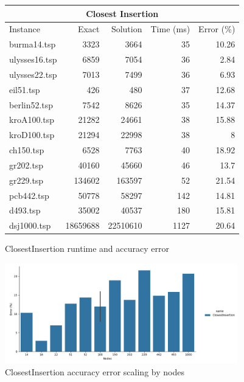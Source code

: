 \begin{figure}[H]
    \centering

    \begin{tabular}{lrrrr}
    \toprule
    \multicolumn{5}{c}{Closest Insertion} \\
    \hline
    Instance & Exact & Solution &   Time (ms) &   Error (\%) \\
    \hline
    burma14.tsp   &     3323 &       3664 &          35 &       10.26 \\
    ulysses16.tsp &     6859 &       7054 &          36 &        2.84 \\
    ulysses22.tsp &     7013 &       7499 &          36 &        6.93 \\
    eil51.tsp     &      426 &        480 &          37 &       12.68 \\
    berlin52.tsp  &     7542 &       8626 &          35 &       14.37 \\
    kroA100.tsp   &    21282 &      24661 &          38 &       15.88 \\
    kroD100.tsp   &    21294 &      22998 &          38 &        8    \\
    ch150.tsp     &     6528 &       7763 &          40 &       18.92 \\
    gr202.tsp     &    40160 &      45660 &          46 &       13.7  \\
    gr229.tsp     &   134602 &     163597 &          52 &       21.54 \\
    pcb442.tsp    &    50778 &      58297 &         142 &       14.81 \\
    d493.tsp      &    35002 &      40537 &         180 &       15.81 \\
    dsj1000.tsp   & 18659688 &   22510610 &        1127 &       20.64 \\
    \bottomrule
    \end{tabular}

    \caption{ClosestInsertion runtime and accuracy error}
    \label{table:closest-insertion-runtime-accuracy}
\end{figure}

\begin{figure}[H]
    \centering

    \includegraphics[width=0.9\textwidth]{./images/ClosestInsertion__approximation_error_.png}

    \caption{ClosestInsertion accuracy error scaling by nodes}
    \label{fig:closest-insertion-accuracy-error}
\end{figure}

